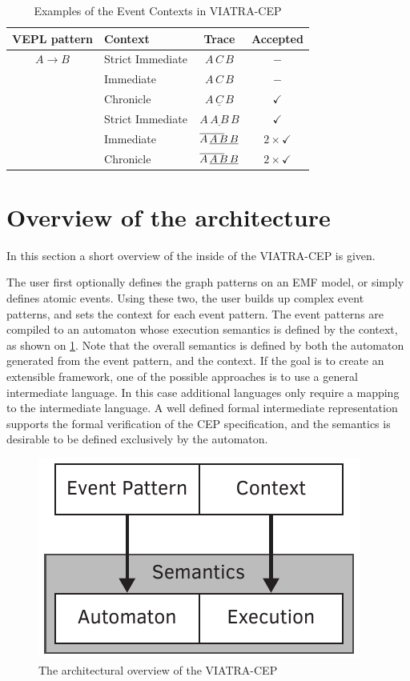 \begin{table}
	\caption{Examples of the Event Contexts in VIATRA-CEP}		
	\label{tab:cep:contextexample}
	\centering
	\begin{tabular}{@{}clcc@{}}
		\toprule
		VEPL pattern & Context & Trace & Accepted \\
		\midrule
		$A \rightarrow B$ & Strict Immediate & $A\,C\,B$ & $-$ \\[1ex]
		& Immediate & $A\,C\,B$ & $-$ \\[1ex ]
		& Chronicle & $\underline{A\,C\,B}$ & $\checkmark$ \\[4ex]
		& Strict Immediate & $A\,\underline{A\,B}\,B$ & $\checkmark$ \\[1ex]
		& Immediate & $\mathrlap{\overline{\phantom{AAB}}} A\, \underline{A\,B\,B}$ & $2\times\checkmark$ \\[1ex]
		& Chronicle & $\mathrlap{\overline{\phantom{AAB}}} A\, \underline{A\,B\,B}$ & $2\times\checkmark$ \\[1ex]
		\bottomrule
	\end{tabular}
\end{table}



\section{Overview of the architecture}
In this section a short overview of the inside of the VIATRA-CEP is given.

The user first optionally defines the graph patterns on an EMF model, or simply defines atomic events.
Using these two, the user builds up complex event patterns, and sets the context for each event pattern. The event patterns are compiled to an automaton
whose execution semantics is defined by the context, as shown on \cref{fig:viatracep:oldcep}. 
Note that the overall semantics is defined by both the automaton generated from the event pattern, and the context.
If the goal is to create an extensible framework, one of the possible approaches is to use a general intermediate language. In this case additional languages only require a mapping to the intermediate language.
A well defined formal intermediate representation supports the formal verification of the CEP specification, and the semantics is desirable to be defined exclusively by the automaton.



\begin{figure}[h]
	\centering
	\includegraphics[width=0.4\linewidth]{figures/chapter_3/oldcep}
	\caption{The architectural overview of the VIATRA-CEP \redraw}
	\label{fig:viatracep:oldcep}
\end{figure}


